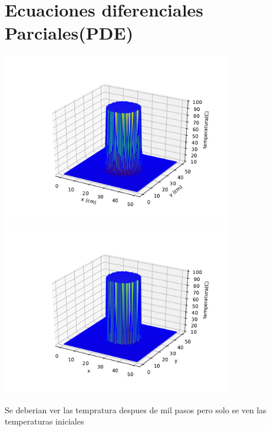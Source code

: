 \documentclass[12pt]{article}
\begin{document}
\section{Ecuaciones diferenciales Parciales(PDE)}
\begin{centering}
\includegraphics[width=0.75\textwidth]{3d2.pdf}
\\
\includegraphics[width=0.75\textwidth]{3d3.pdf}

Se deberian ver las tempratura despues de mil pasos pero solo se ven las temperaturas iniciales
\end{centering}

 
\end{document}
